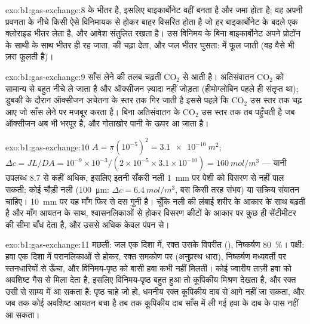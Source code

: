 \begin{solution}{exo:b1:gas-exchange:8}
  के भीतर है, इसलिए बाइकार्बोनेट वहीं बनता है
और जमा होता है; वह अपनी प्रवणता के नीचे किसी ऐसे विनिमायक से होकर बाहर
विसरित होता है जो हर बाइकार्बोनेट के बदले एक क्लोराइड भीतर लेता है, और
आवेश संतुलित रखता है। उस विनिमय के बिना बाइकार्बोनेट अपने प्रोटॉन के
साथी के साथ भीतर ही रह जाता,  की  चढ़ा देता, और जल
भीतर घुसता:   में फूल जाती (वह वैसे भी ज़रा फूलती है)।
\end{solution}

\begin{solution}{exo:b1:gas-exchange:9}
साँस लेने की तलब चढ़ती $\mathrm{CO_2}$ से आती है। अतिसंवातन
$\mathrm{CO_2}$ को सामान्य से बहुत नीचे ले जाता है और ऑक्सीजन ज़्यादा
नहीं जोड़ता (हीमोग्लोबिन पहले ही संतृप्त था); डुबकी के दौरान ऑक्सीजन
अचेतना के स्तर तक गिर जाती है इससे पहले कि $\mathrm{CO_2}$ उस स्तर तक
चढ़ आए जो साँस लेने पर मजबूर करता है। बिना अतिसंवातन के
$\mathrm{CO_2}$ उस स्तर तक तब पहुँचती है जब ऑक्सीजन अब भी भरपूर है, और
गोताखोर पानी के ऊपर आ जाता है।
\end{solution}

\begin{solution}{exo:b1:gas-exchange:10}
$A = \pi(10^{-5})^2 = \qty{3.1e-10}{m^2}$; $\Delta c = JL/DA =
10^{-9}\times 10^{-3}/(2\times 10^{-5}\times 3.1\times 10^{-10}) =
\qty{160}{mol/m^3}$ --- यानी उपलब्ध \qty{8.7}{} से कहीं अधिक, इसलिए
इतनी सँकरी नली \qty{1}{mm} पर पेशी को विसरण से नहीं पाल सकती;
कोई चौड़ी नली (\qty{100}{\micro m}: $\Delta c = \qty{6.4}{mol/m^3}$, बस
किसी तरह संभव) या सक्रिय संवातन चाहिए। \qty{10}{mm} पर
यह माँग फिर से दस गुनी है। चूँकि नली की लंबाई शरीर के आकार के साथ बढ़ती
है और माँग आयतन के साथ, श्वासनलिकाओं से होकर विसरण कीटों के आकार पर कुछ
ही सेंटीमीटर की सीमा बाँध देता है, और उससे अधिक केवल पंपन से।
\end{solution}

\begin{solution}{exo:b1:gas-exchange:11}
मछली: जल एक दिशा में, रक्त उसके विपरीत (),
निष्कर्षण \qty{80}{\%}। पक्षी: हवा एक दिशा में परानलिकाओं से होकर,
रक्त समकोण पर (अनुप्रस्थ धारा), निष्कर्षण
मध्यवर्ती पर स्तनधारियों से ऊँचा, और विनिमय-पृष्ठ को
बासी हवा कभी नहीं मिलती। कोई ज्वारीय  ताज़ी हवा को अवशिष्ट गैस से
मिला देता है, इसलिए विनिमय-पृष्ठ बहुत हुआ तो कूपिकीय मिश्रण देखता है, और
रक्त उसी से साम्य में आ सकता है: पृष्ठ चाहे जो हो, धमनीय रक्त कूपिकीय
दाब से आगे नहीं जा सकता, और जब तक कोई अवशिष्ट आयतन बचा है तब तक कूपिकीय
दाब साँस में ली गई हवा के दाब के पास नहीं आ सकता।
\end{solution}

